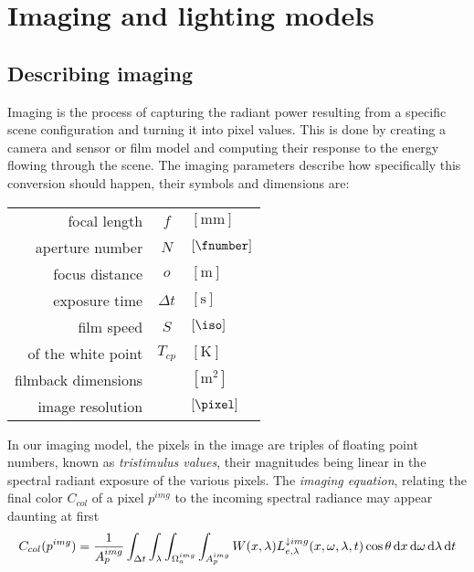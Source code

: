 
\chapter{Imaging and lighting models}\label{ch:lighting}
\section{Describing imaging}\label{ch:imaging}

Imaging is the process of capturing the \gls{radiant power} resulting 
from a specific \gls{scene} configuration and turning it into pixel values. 
This is done by creating a camera and sensor or film model and computing 
their response to the energy flowing through the scene.
The imaging parameters describe how specifically this conversion should happen, 
their symbols and dimensions are:

\vskip 2mm
\begin{center}
\begin{tabular}{r c l}
	focal length        & $f$ & $[\unit{\milli\meter}]$ \\
	aperture number     & $N$ & $[\unit{\fnumber}]$ \\
	focus distance      & $o$ & $[\unit{\meter}]$ \\
	exposure time       & $\Delta t$ & $[\unit{\second}]$ \\
	film speed          & $S$ & $[\unit{\iso}]$ \\
	\glsname{CCT} of the white point & $T_{cp}$ & $[\unit{\kelvin}]$ \\
	filmback dimensions &     & $[\unit{\square\meter}]$ \\
	image resolution    &     & $[\unit{\pixel}]$
\end{tabular}
\end{center}

\vskip 2mm

In our imaging model, the pixels in the image are triples of
floating point numbers, known as \textsl{\gls{tristimulus values}}, their
magnitudes being linear in the spectral radiant \gls{exposure} of the various
pixels. 
The \textsl{\gls{imaging equation}}, relating the final color $C_{col}$ of a pixel
$p^{img}$ to the incoming \gls{spectral} \gls{radiance} may appear daunting at first
\begin{equation}\label{eqn:imaging1}
	C_{col}(p^{img})  = \frac1{A_p^{img}}
	\int_{\Delta t} \int_{\lambda} \int_{\Omega^{img}_a} \int_{A_p^{img}}
	  W(x, \lambda) L^{\downarrow
		img}_{e,\lambda}(x, \omega, \lambda, t) \cos\theta\mathop{}\!\mathrm{d} x\mathop{}\!\mathrm{d}\omega\mathop{}\!\mathrm{d}\lambda\mathop{}\!\mathrm{d} t
\end{equation}

